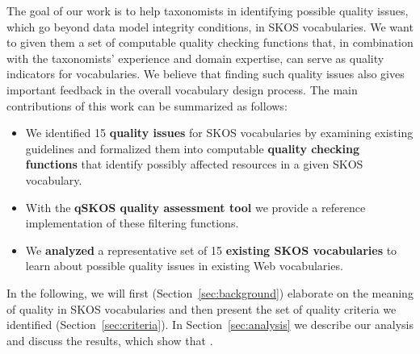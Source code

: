 
The goal of our work is to help taxonomists in identifying possible quality issues, which go beyond data model integrity conditions, in SKOS vocabularies. We want to given them a set of computable quality checking functions that, in combination with the taxonomists' experience and domain expertise, can serve as quality indicators for vocabularies. We believe that finding such quality issues also gives important feedback in the overall vocabulary design process. The main contributions of this work can be summarized as follows:

\begin{itemize}

	\item We identified 15 \textbf{quality issues} for SKOS vocabularies by examining existing guidelines and formalized them into computable \textbf{quality checking functions} that identify possibly affected resources in a given SKOS vocabulary.
	
	\item With the \textbf{qSKOS quality assessment tool} we provide a reference implementation of these filtering functions.

	\item We \textbf{analyzed} a representative set of 15 \textbf{existing SKOS vocabularies} to learn about possible quality issues in existing Web vocabularies.

\end{itemize}

In the following, we will first (Section~\ref{sec:background}) elaborate on the meaning of quality in SKOS vocabularies and then present the set of quality criteria we identified (Section~\ref{sec:criteria}). In Section~\ref{sec:analysis} we describe our analysis and discuss the results, which show that .
